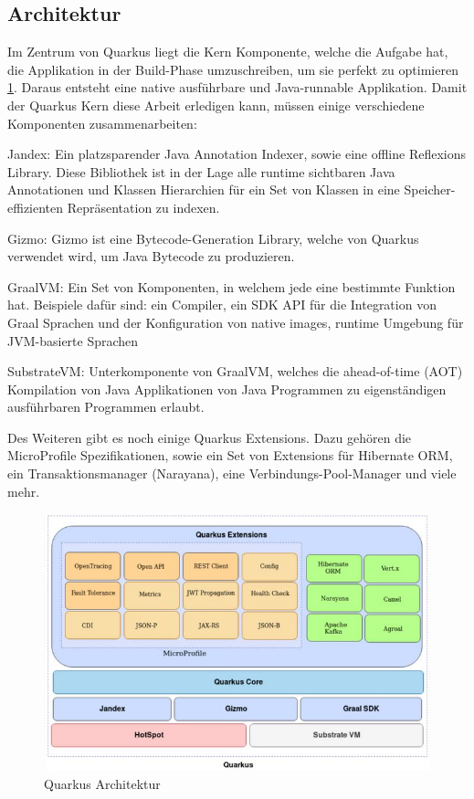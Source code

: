 \subsection{Architektur}
Im Zentrum von Quarkus liegt die Kern Komponente, welche die Aufgabe hat, die Applikation in der Build-Phase umzuschreiben, um sie perfekt zu optimieren \ref{fig:impl:QuarkusArchitektur}. Daraus entsteht eine native ausführbare und Java-runnable Applikation. Damit der Quarkus Kern diese Arbeit erledigen kann, müssen einige verschiedene Komponenten zusammenarbeiten: 

\begin{compactitem}
    \item Jandex: Ein platzsparender Java Annotation Indexer, sowie eine offline Reflexions Library. Diese Bibliothek ist in der Lage alle runtime sichtbaren Java Annotationen und Klassen Hierarchien für ein Set von Klassen in eine Speicher-effizienten Repräsentation zu indexen.     
    \item Gizmo: Gizmo ist eine Bytecode-Generation Library, welche von Quarkus verwendet wird, um Java Bytecode zu produzieren.             
    \item GraalVM: Ein Set von Komponenten, in welchem jede eine bestimmte Funktion hat. Beispiele dafür sind: ein Compiler, ein SDK API für die Integration von Graal Sprachen und der Konfiguration von native images, runtime Umgebung für JVM-basierte Sprachen
    \item SubstrateVM: Unterkomponente von GraalVM, welches die ahead-of-time (AOT) Kompilation von Java Applikationen von Java Programmen zu eigenständigen ausführbaren Programmen erlaubt.
\end{compactitem}

Des Weiteren gibt es noch einige Quarkus Extensions. Dazu gehören die MicroProfile Spezifikationen, sowie ein Set von Extensions für Hibernate ORM, ein Transaktionsmanager (Narayana), eine Verbindungs-Pool-Manager und viele mehr. 

\begin{figure}
    \centering
    \includegraphics[scale=0.5]{pics/quarkusArchitektur.JPG}
    \caption{Quarkus Architektur}
    \label{fig:impl:QuarkusArchitektur}
\end{figure}

